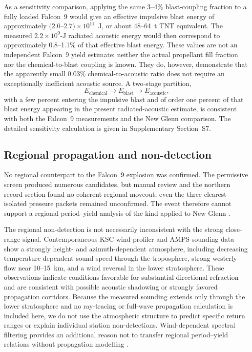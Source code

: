 \documentclass[]{seismica}
\begin{document}
As a sensitivity comparison, applying the same 3--4\% blast-coupling fraction
to a fully loaded Falcon~9 would give an effective impulsive blast energy of
approximately $(2.0$--$2.7)\times10^{11}$~J, or about 48--64~t TNT
equivalent. The measured $2.2\times10^9$-J radiated acoustic energy would then
correspond to approximately 0.8--1.1\% of that effective blast energy. These
values are not an independent Falcon~9 yield estimate: neither the actual
propellant fill fraction nor the chemical-to-blast coupling is known. They do,
however, demonstrate that the apparently small 0.03\% chemical-to-acoustic
ratio does not require an exceptionally inefficient acoustic source. A
two-stage partition,
\[
 E_{\mathrm{chemical}}
 \rightarrow E_{\mathrm{blast}}
 \rightarrow E_{\mathrm{acoustic}},
\]
with a few percent entering the impulsive blast and of order one percent of
that blast energy appearing in the present radiated-acoustic estimate, is
consistent with both the Falcon~9 measurements and the New Glenn comparison.
The detailed sensitivity calculation is given in Supplementary Section~S7.

\subsection{Regional propagation and non-detection}

No regional counterpart to the Falcon~9 explosion was confirmed. The
permissive screen produced numerous candidates, but manual review and the
northern record section found no coherent regional moveout; even the three
clearest isolated pressure packets remained unconfirmed. The event therefore
cannot support a regional period--yield analysis of the kind applied to New
Glenn \citep{silber_scamfer_newglenn_2026}.

The regional non-detection is not necessarily inconsistent with the strong
close-range signal. Contemporaneous KSC wind-profiler and AMPS sounding data
show a strongly height- and azimuth-dependent atmosphere, including decreasing
temperature-dependent sound speed through the troposphere, strong westerly
flow near 10--15~km, and a wind reversal in the lower stratosphere. These
observations indicate conditions favorable for substantial directional
refraction and are consistent with possible acoustic shadowing or strongly
favored propagation corridors. Because the measured sounding extends only
through the lower stratosphere and no ray-tracing or full-wave propagation
calculation is included here, we do not use the atmospheric structure to
predict specific return ranges or explain individual station
non-detections. Wind-dependent spectral filtering provides an additional
reason not to transfer regional period--yield relations without propagation
modelling \citep{silber_wind_filtering_2026}.
\end{document}
